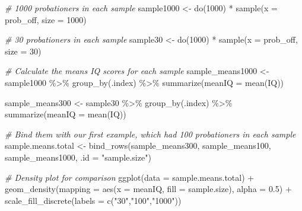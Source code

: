 \documentclass[
]{book}
\newenvironment{Shaded}{\begin{snugshade}}{\end{snugshade}}
\newcommand{\AttributeTok}[1]{\textcolor[rgb]{0.77,0.63,0.00}{#1}}
\newcommand{\CommentTok}[1]{\textcolor[rgb]{0.56,0.35,0.01}{\textit{#1}}}
\newcommand{\DecValTok}[1]{\textcolor[rgb]{0.00,0.00,0.81}{#1}}
\newcommand{\FloatTok}[1]{\textcolor[rgb]{0.00,0.00,0.81}{#1}}
\newcommand{\FunctionTok}[1]{\textcolor[rgb]{0.00,0.00,0.00}{#1}}
\newcommand{\NormalTok}[1]{#1}
\newcommand{\OtherTok}[1]{\textcolor[rgb]{0.56,0.35,0.01}{#1}}
\newcommand{\SpecialCharTok}[1]{\textcolor[rgb]{0.00,0.00,0.00}{#1}}
\newcommand{\StringTok}[1]{\textcolor[rgb]{0.31,0.60,0.02}{#1}}
\begin{document}
\begin{Shaded}
\begin{Highlighting}[]
\CommentTok{\# 1000 probationers in each sample }
\NormalTok{sample1000 }\OtherTok{\textless{}{-}} \FunctionTok{do}\NormalTok{(}\DecValTok{1000}\NormalTok{) }\SpecialCharTok{*} \FunctionTok{sample}\NormalTok{(}\AttributeTok{x =}\NormalTok{ prob\_off, }\AttributeTok{size =} \DecValTok{1000}\NormalTok{) }

\CommentTok{\# 30 probationers in each sample }
\NormalTok{sample30 }\OtherTok{\textless{}{-}} \FunctionTok{do}\NormalTok{(}\DecValTok{1000}\NormalTok{) }\SpecialCharTok{*} \FunctionTok{sample}\NormalTok{(}\AttributeTok{x =}\NormalTok{ prob\_off, }\AttributeTok{size =} \DecValTok{30}\NormalTok{) }

\CommentTok{\# Calculate the means IQ scores for each sample }
\NormalTok{sample\_means1000 }\OtherTok{\textless{}{-}}\NormalTok{ sample1000 }\SpecialCharTok{\%\textgreater{}\%} 
  \FunctionTok{group\_by}\NormalTok{(.index) }\SpecialCharTok{\%\textgreater{}\%} 
  \FunctionTok{summarize}\NormalTok{(}\AttributeTok{meanIQ =} \FunctionTok{mean}\NormalTok{(IQ)) }

\NormalTok{sample\_means300 }\OtherTok{\textless{}{-}}\NormalTok{ sample30 }\SpecialCharTok{\%\textgreater{}\%} 
  \FunctionTok{group\_by}\NormalTok{(.index) }\SpecialCharTok{\%\textgreater{}\%} 
  \FunctionTok{summarize}\NormalTok{(}\AttributeTok{meanIQ =} \FunctionTok{mean}\NormalTok{(IQ)) }

\CommentTok{\# Bind them with our first example, which had 100 probationers in each sample }
\NormalTok{sample.means.total }\OtherTok{\textless{}{-}} \FunctionTok{bind\_rows}\NormalTok{(sample\_means300, sample\_means100, sample\_means1000, }\AttributeTok{.id =} \StringTok{"sample.size"}\NormalTok{)}

\CommentTok{\# Density plot for comparison }
\FunctionTok{ggplot}\NormalTok{(}\AttributeTok{data =}\NormalTok{ sample.means.total) }\SpecialCharTok{+} 
  \FunctionTok{geom\_density}\NormalTok{(}\AttributeTok{mapping =} \FunctionTok{aes}\NormalTok{(}\AttributeTok{x =}\NormalTok{ meanIQ, }\AttributeTok{fill =}\NormalTok{ sample.size), }\AttributeTok{alpha =} \FloatTok{0.5}\NormalTok{) }\SpecialCharTok{+}
  \FunctionTok{scale\_fill\_discrete}\NormalTok{(}\AttributeTok{labels =} \FunctionTok{c}\NormalTok{(}\StringTok{"30"}\NormalTok{,}\StringTok{"100"}\NormalTok{,}\StringTok{"1000"}\NormalTok{))}
\end{Highlighting}
\end{Shaded}
\end{document}
